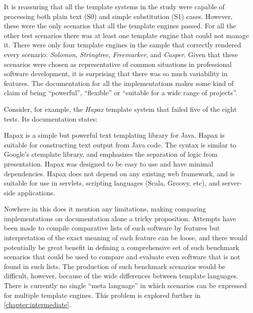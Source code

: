 It is reassuring that all the template systems in the study were capable of processing both plain text (S0) and simple substitution (S1) cases. However, these were the only scenarios that all the \gls{template engine}s passed. For all the other test scenarios there was at least one \gls{template engine} that could not manage it. There were only four \gls{template engine}s in the sample that correctly rendered every scenario: \emph{Solomon}, \emph{Stringtree}, \emph{Freemarker}, and \emph{Casper}. Given that these scenarios were chosen as representative of common situations in professional software development, it is surprising that there was so much variability in features. The documentation for all the implementations makes some kind of claim of being \enquote{powerful}, \enquote{flexible} or \enquote{suitable for a wide range of projects}. 

Consider, for example, the \emph{Hapax} template system that failed five of the eight tests. Its documentation states:

\begin{displayquote}
Hapax is a simple but powerful text templating library for Java. Hapax is suitable for constructing text output from Java code. The syntax is similar to Google's ctemplate library, and emphasizes the separation of logic from presentation. Hapax was designed to be easy to use and have minimal dependencies. Hapax does not depend on any existing web framework, and is suitable for use in servlets, scripting languages (Scala, Groovy, etc), and server-side applications.
\end{displayquote}

Nowhere in this does it mention any limitations, making comparing implementations on documentation alone a tricky proposition. Attempts have been made to compile comparative lists of such software by features \citep{Wikipedia2018} but interpretation of the exact meaning of each feature can be loose, and there would potentially be great benefit in defining a comprehensive set of such benchmark scenarios that could be used to compare and evaluate even software that is not found in such lists. The production of such benchmark scenarios would be difficult, however, because of the wide differences between \gls{template language}s. There is currently no single \enquote{meta language} in which scenarios can be expressed for multiple \gls{template engine}s. This problem is explored further in \autoref{chapter:intermediate}.


